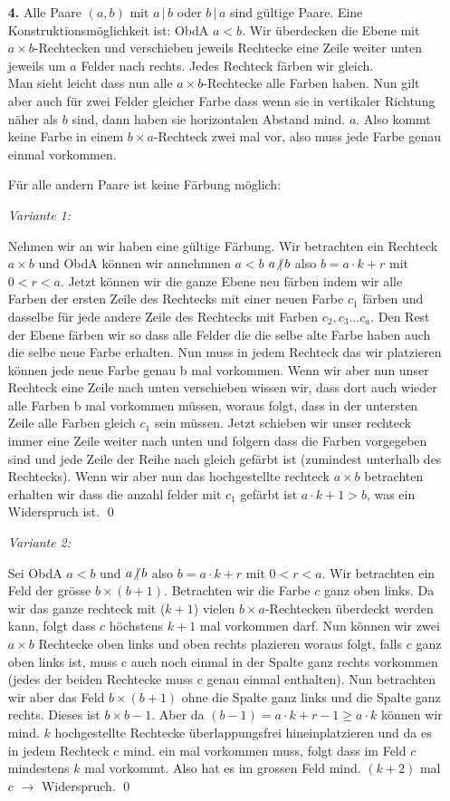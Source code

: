 \documentclass[12pt,a4paper]{article}
\theoremstyle{plain}
\theoremstyle{definition}
\renewcommand{\div}{\, | \,}
\newcommand{\ndiv}{\mathopen{\mathchoice{\not{|}\,}{\not{|}\,}{\!\not{\:|}}{\not{|}}}}
\begin{document}
\begin{itemize}
\item[\textbf{4.}]
Alle Paare $(a,b)$ mit $a\div b$ oder $b\div a$ sind gültige Paare.
Eine Konstruktionsmöglichkeit ist: 
ObdA $a<b$. Wir überdecken die Ebene mit $a \times b$-Rechtecken und verschieben jeweils Rechtecke eine Zeile weiter unten jeweils um $a$ Felder nach rechts. Jedes Rechteck färben wir gleich.\\
Man sieht leicht dass nun alle $a \times b$-Rechtecke alle Farben haben.
Nun gilt aber auch für zwei Felder gleicher Farbe dass wenn sie in vertikaler Richtung näher als $b$ sind, dann haben sie horizontalen Abstand mind. $a$. Also kommt keine Farbe in einem $b \times a$-Rechteck zwei mal vor, also muss jede Farbe genau einmal vorkommen.

Für alle andern Paare ist keine Färbung möglich:

\textit{Variante 1:}

Nehmen wir an wir haben eine gültige Färbung.
Wir betrachten ein Rechteck $a \times b$ und ObdA können wir annehmnen $a<b$ $a \ndiv b$ also $b=a \cdot k+r$ mit $0<r<a$.
Jetzt können wir die ganze Ebene neu färben indem wir alle Farben der ersten Zeile des Rechtecks mit einer neuen Farbe $c_1$ färben und dasselbe für jede andere Zeile des Rechtecks mit Farben $c_2, c_3... c_a$. Den Rest der Ebene färben wir so dass alle Felder die die selbe alte Farbe haben auch die selbe neue Farbe erhalten.
Nun muss in jedem Rechteck das wir platzieren können jede neue Farbe genau b mal vorkommen.
Wenn wir aber nun unser Rechteck eine Zeile nach unten verschieben wissen wir, dass dort auch wieder alle Farben b mal vorkommen müssen, woraus folgt, dass in der untersten Zeile alle Farben gleich $c_1$ sein müssen. Jetzt schieben wir unser rechteck immer eine Zeile weiter nach unten und folgern dass die Farben vorgegeben sind und jede Zeile der Reihe nach gleich gefärbt ist (zumindest unterhalb des Rechtecks).
Wenn wir aber nun das hochgestellte rechteck $a \times b$ betrachten erhalten wir dass die anzahl felder mit $c_1$ gefärbt ist $a\cdot k+1 > b$, was ein Widerspruch ist. \qed

\textit{Variante 2:}

Sei ObdA $a<b$ und $a \ndiv b$ also $b=a \cdot k+r$ mit $0<r<a$. Wir betrachten ein Feld der grösse $b \times (b+1)$. Betrachten wir die Farbe $c$ ganz oben links. Da wir das ganze rechteck mit ($k+1$) vielen $b \times a$-Rechtecken überdeckt werden kann, folgt dass $c$ höchstens $k+1$ mal vorkommen darf.
Nun können wir zwei $a \times b$ Rechtecke oben links und oben rechts plazieren woraus folgt, falls $c$ ganz oben links ist, muss c auch noch einmal in der Spalte ganz rechts vorkommen (jedes der beiden Rechtecke muss c genau einmal enthalten).
Nun betrachten wir aber das Feld $b \times (b+1)$ ohne die Spalte ganz links und die Spalte ganz rechts. Dieses ist $b \times b-1$. Aber da $(b-1) = a \cdot k+r -1 \ge a \cdot k$ können wir mind. $k$ hochgestellte Rechtecke überlappungsfrei hineinplatzieren und da es in jedem Rechteck c mind. ein mal vorkommen muss, folgt dass im Feld $c$ mindestens $k$ mal vorkommt. Also hat es im grossen Feld mind. $(k+2)$ mal $c$ $\rightarrow$ Widerspruch. \qed



\end{itemize}
\end{document}
